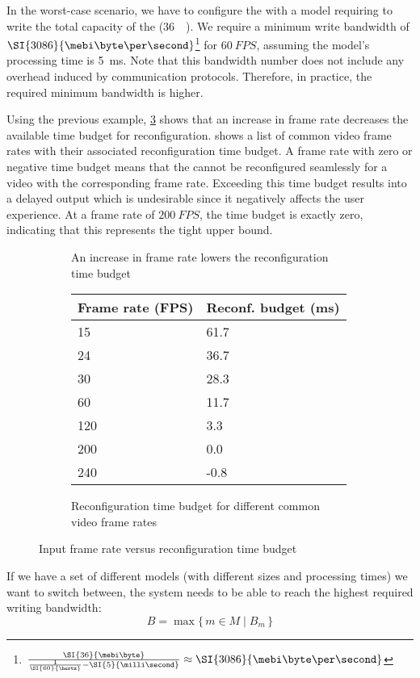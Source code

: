 In the worst-case scenario, we have to configure the \graicore{} with a model requiring to write the total capacity of the \graicore{} (\SI{36}{\mebi\byte}).
We require a minimum write bandwidth of $\SI{3086}{\mebi\byte\per\second}$\footnote{$\frac{\SI{36}{\mebi\byte}}{\frac{1}{\SI{60}{\hertz}} - \SI{5}{\milli\second}} \approx \SI{3086}{\mebi\byte\per\second}$} for $\SI{60}{FPS}$, assuming the model's processing time is \SI{5}{ms}.
Note that this bandwidth number does not include any overhead induced by communication protocols. Therefore, in practice, the required minimum bandwidth is higher. 

Using the previous example, \cref{fig:frame_rate_versus_time_budget} shows that an increase in frame rate decreases the available time budget for reconfiguration.
 shows a list of common video frame rates with their associated reconfiguration time budget.
A frame rate with zero or negative time budget means that the \graicore{} cannot be reconfigured seamlessly for a video with the corresponding frame rate.
Exceeding this time budget results into a delayed output which is undesirable since it negatively affects the user experience.
At a frame rate of $\SI{200}{FPS}$, the time budget is exactly zero, indicating that this represents the tight upper bound.

\begin{figure}[htbp]
    \centering
    \begin{subfigure}[b]{0.48\textwidth}
        \begin{adjustbox}{width=\linewidth}
        
        \end{adjustbox}
        \caption{An increase in frame rate lowers the reconfiguration time budget}
        \label{}
    \end{subfigure}
    \hfill
    \begin{subfigure}[b]{0.48\textwidth}
        \begin{tabular}{@{}ll@{}}
        \toprule
        Frame rate (FPS) & Reconf. budget (ms) \\ \midrule
        15               & 61.7                \\
        24               & 36.7                \\
        30               & 28.3                \\
        60               & 11.7                \\
        120              & 3.3                 \\
        200              & 0.0                 \\
        240              & -0.8                \\ \bottomrule
        \end{tabular}
        \caption{Reconfiguration time budget for different common video frame rates}
        \label{tab:common_fps}
    \end{subfigure}
    \caption[]{Input frame rate versus reconfiguration time budget}
    \label{fig:frame_rate_versus_time_budget}
\end{figure}

If we have a set of different models (with different sizes and processing times) we want to switch between, the system needs to be able to reach the highest required writing bandwidth:
\begin{equation}
    B = \max\{\,m \in M \mid B_m \,\} 
\end{equation}

